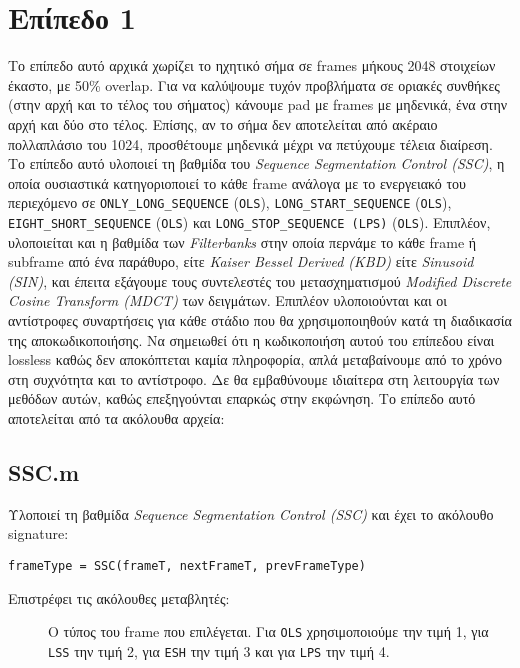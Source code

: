 \section*{Επίπεδο 1}
Το επίπεδο αυτό αρχικά χωρίζει το ηχητικό σήμα σε frames μήκους 2048 στοιχείων
έκαστο, με 50\% overlap. Για να καλύψουμε τυχόν προβλήματα σε οριακές συνθήκες
(στην αρχή και το τέλος του σήματος) κάνουμε pad με frames με μηδενικά, ένα
στην αρχή και δύο στο τέλος. Επίσης, αν το σήμα δεν αποτελείται από ακέραιο
πολλαπλάσιο του 1024, προσθέτουμε μηδενικά μέχρι να πετύχουμε τέλεια διαίρεση.
Το επίπεδο αυτό υλοποιεί τη βαθμίδα του \emph{Sequence Segmentation Control
(SSC)}, η οποία ουσιαστικά κατηγοριοποιεί το κάθε frame ανάλογα με το
ενεργειακό του περιεχόμενο σε \verb|ONLY_LONG_SEQUENCE| (\verb|OLS|),
\verb|LONG_START_SEQUENCE| (\verb|OLS|), \verb|EIGHT_SHORT_SEQUENCE|
(\verb|OLS|) και \verb|LONG_STOP_SEQUENCE (LPS)| (\verb|OLS|). Επιπλέον,
υλοποιείται και η βαθμίδα των \emph{Filterbanks} στην οποία περνάμε το κάθε
frame ή subframe από ένα παράθυρο, είτε \emph{Kaiser Bessel Derived (KBD)} είτε
\emph{Sinusoid (SIN)}, και έπειτα εξάγουμε τους συντελεστές του μετασχηματισμού
\emph{Modified Discrete Cosine Transform (MDCT)} των δειγμάτων. Επιπλέον
υλοποιούνται και οι αντίστροφες συναρτήσεις για κάθε στάδιο που θα
χρησιμοποιηθούν κατά τη διαδικασία της αποκωδικοποιήσης. Να σημειωθεί ότι η
κωδικοποιήση αυτού του επίπεδου είναι lossless καθώς δεν αποκόπτεται καμία
πληροφορία, απλά μεταβαίνουμε από το χρόνο στη συχνότητα και το αντίστροφο.
Δε θα εμβαθύνουμε ιδιαίτερα στη λειτουργία των μεθόδων αυτών, καθώς
επεξηγούνται επαρκώς στην εκφώνηση. Το επίπεδο αυτό αποτελείται από τα
ακόλουθα αρχεία:


\subsection*{SSC.m}
Υλοποιεί τη βαθμίδα \emph{Sequence Segmentation Control (SSC)} και έχει το
ακόλουθο signature:
\begin{center}
	\verb|frameType = SSC(frameT, nextFrameT, prevFrameType)|
\end{center}

\noindent Επιστρέφει τις ακόλουθες μεταβλητές:
\begin{description}
\item[] Ο τύπος του frame που επιλέγεται. Για \verb|OLS|
	χρησιμοποιούμε την τιμή 1, για 	\verb|LSS| την τιμή 2, για \verb|ESH| την
	τιμή 3 και για \verb|LPS| την τιμή 4.
\end{description}

